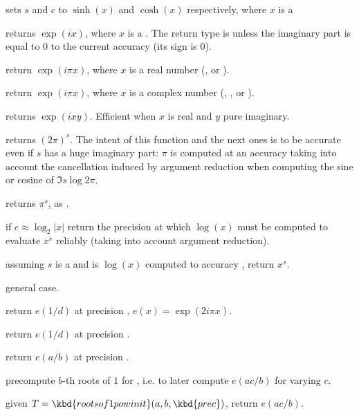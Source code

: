  sets $s$ and $c$ to
$\sinh(x)$ and $\cosh(x)$ respectively, where $x$ is a 

 returns $\exp(ix)$, where $x$ is a .
The return type is  unless the imaginary part is equal to $0$
to the current accuracy (its sign is $0$).

 return $\exp(i \pi x)$, where $x$ is a
real number (,  or ).

 return $\exp(i \pi x)$, where $x$ is a
complex number (, ,  or ).

 returns $\exp(ixy)$. Efficient
when $x$ is real and $y$ pure imaginary.

 returns $(2\pi)^s$. The intent of this
function and the next ones is to be accurate even if $s$ has a huge imaginary
part: $\pi$ is computed at an accuracy taking into account the cancellation
induced by argument reduction when computing the sine or cosine of
$\Im s \log 2\pi$.

 returns $\pi^s$, as .

 if $e \approx \log_2 |x|$
return the precision at which $\log(x)$ must be computed to evaluate $x^s$
reliably (taking into account argument reduction).

 assuming $s$ is a
 and  is $\log(x)$ computed to accuracy
, return $x^s$.

 general case.

 return $e(1/d)$ at precision
, $e(x) = \exp(2i\pi x)$.

 return $e(1/d)$ at
precision .

 return $e(a/b)$ at
precision .

 precompute $b$-th
roots of $1$ for , i.e. to later compute $e(ac/b)$ for
varying $c$.

 given
$T = \kbd{rootsof1powinit}(a,b,\kbd{prec})$, return $e(ac/b)$.


